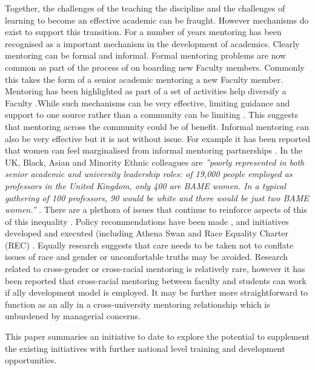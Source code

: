 \documentclass[sigconf]{acmart}
\begin{document}
Together, the challenges of the teaching the discipline and the challenges of learning to become an effective academic can be fraught. However mechanisms do exist to support this transition. For a number of years  mentoring has been recognised as a important mechanism in the development of academics. Clearly mentoring can be formal and informal. Formal mentoring problems are now common as part of the process of on boarding new Faculty members.  Commonly this takes the form of a senior academic mentoring a new Faculty member. Mentoring has been highlighted as part of a set of activities help diversify a Faculty \cite{Golubchik2018}.While such mechanisms can be very effective, limiting guidance and support to one source rather than a community can be limiting \cite{deJanasz}. This suggests that mentoring across the community could be of benefit.  Informal mentoring can also be very effective but it is not without issue. For example it has been reported that women can feel marginalised from informal mentoring partnerships \cite{gibson2006mentoring}.   In the UK, Black, Asian and Minority Ethnic colleagues are \textit{''poorly represented in both senior academic and university leadership roles: of 19,000 people employed as professors in the United Kingdom, only 400 are BAME women. In a typical gathering of 100 professors, 90 would be white and there would be just two BAME women.''} \cite[p.~I]{UniversitiesUK19}. There are a plethora of issues that continue to reinforce aspects of this of this inequality \cite{arday20}. Policy recommendations have been made \cite{bhopal2014experiences}, and initiatives developed and executed (including Athena Swan \cite{AthenaSwan} and Race Equality Charter (REC)  \cite{REC}. Equally research suggests that care needs to be taken not to conflate issues of race and gender \cite{Bhopal19} or uncomfortable truths may be avoided. Research related to cross-gender or cross-racial mentoring is relatively rare, however it has been reported that cross-racial mentoring between faculty and students can work \cite{reddick2016don} if ally development model is employed. It may be further more straightforward to function as an ally in a cross-university mentoring relationship which is unburdened by managerial concerns.

This paper summaries an initiative to date to explore the potential to supplement the existing initiatives with further national level training and development opportunities.
\end{document}
